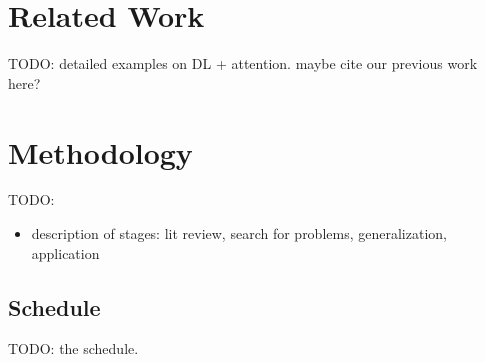 \documentclass[article]{IEEEtran}
\begin{document}
\section{Related Work}
TODO: detailed examples on DL + attention.
maybe cite our previous work here?

\section{Methodology}
TODO:
\begin{itemize}
    \item description of stages: lit review,
        search for problems, generalization, application
\end{itemize}

\subsection{Schedule}
TODO: the schedule.

\printbibliography
\end{document}
